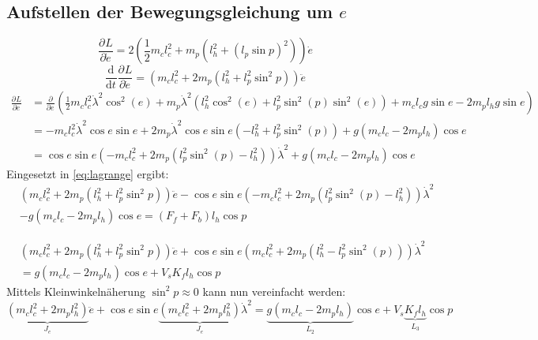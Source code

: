 \documentclass{article}
\newcommand{\partiell}[3][]{\frac{\partial^{#1}#2}{\partial{#3}^{#1}}}
\newcommand{\diff}[3][]{\frac{\mathrm{d}^{#1}#2}{\mathrm{d}{#3}^{#1}}}
\begin{document}
	\subsection{Aufstellen der Bewegungsgleichung um $e$}
	\begin{equation}
	\partiell{L}{\dot{e}} = 2(\frac{1}{2}m_cl_c^2
	+ m_p(l_h^2+(l_p\sin p)^2))\dot{e}
	\end{equation}
	\begin{equation}
	\diff{}{t}\partiell{L}{\dot{e}} = (m_cl_c^2
	+ 2 m_p(l_h^2+l_p^2\sin^2 p))\ddot{e}
	\end{equation}
	\begin{equation}
	\begin{split}
	\partiell{L}{e} &= \partiell{}{e}(\frac{1}{2} m_c l_c^2 \dot{\lambda}^2 \cos^2 (e) + m_p \dot{\lambda}^2 (l_h^2 \cos^2 (e) + l_p^2 \sin^2 (p) \sin^2 (e))
	+ m_c l_c g \sin e - 2 m_p l_h g \sin e)\\
	&= -m_c l_c^2 \dot{\lambda}^2 \cos e \sin e + 2 m_p \dot{\lambda}^2 \cos e \sin e (-l_h^2  + l_p^2 \sin^2 (p) ) + g(m_c l_c - 2 m_p l_h) \cos e\\
	&= \cos e \sin e  (-m_c l_c^2 + 2 m_p (l_p^2 \sin^2 (p) -l_h^2  )) \dot{\lambda}^2+ g(m_c l_c - 2 m_p l_h) \cos e
	\end{split}
	\end{equation}
	Eingesetzt in \eqref{eq:lagrange} ergibt:
	\begin{equation}
	\begin{split}
	&(m_cl_c^2+ 2 m_p(l_h^2+l_p^2\sin^2 p))\ddot{e} - \cos e \sin e (-m_c l_c^2 + 2 m_p (l_p^2 \sin^2 (p) -l_h^2  ))\dot{\lambda}^2 \\
	& - g(m_c l_c - 2 m_p l_h) \cos e = (F_f + F_b)l_h  \cos p
	\end{split}
	\end{equation}
	
	\begin{equation}
	\begin{split}
	&(m_cl_c^2+ 2 m_p(l_h^2+l_p^2\sin^2 p))\ddot{e} + \cos e \sin e (m_c l_c^2 + 2 m_p ( l_h^2 -l_p^2 \sin^2 (p) )) \dot{\lambda}^2 \\
	&= g(m_c l_c - 2 m_p l_h) \cos e + V_s K_f l_h  \cos p
	\end{split}
	\end{equation}
	Mittels Kleinwinkelnäherung $\sin^2 p \approx 0$ kann nun vereinfacht werden:
	\begin{equation}
	\underbrace{(m_cl_c^2+ 2 m_p l_h^2)}_{J_e}\ddot{e} + \cos e \sin e \underbrace{(m_c l_c^2 + 2 m_p l_h^2 )}_{J_e} \dot{\lambda}^2 
	= \underbrace{g(m_c l_c - 2 m_p l_h)}_{L_2} \cos e + V_s \underbrace{ K_f l_h}_{L_3}  \cos p
	\end{equation}
\end{document}
